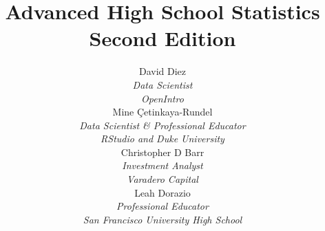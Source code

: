 
\title{\huge Advanced High School Statistics\vspace{1.5mm} \\ \Large Second Edition}
\author{David Diez \\
\small\emph{Data Scientist}\\
\small\emph{OpenIntro} \\[6mm]
Mine \c{C}etinkaya-Rundel \\
\small\emph{Data Scientist \& Professional Educator}\\
\small\emph{RStudio and Duke University} \\[6mm]
Christopher D Barr \\
\small\emph{Investment Analyst} \\
\small\emph{Varadero Capital} \\[6mm]
Leah Dorazio \\
\small\emph{Professional Educator}\\
\small\emph{San Francisco University High School} \\
}
